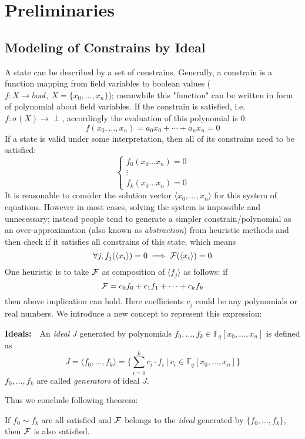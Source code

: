 \section{Preliminaries}
\label{sec:prelim}
\subsection{Modeling of Constrains by Ideal}
A state can be described by a set of constrains. Generally, a constrain is a function mapping 
from field variables to boolean values ($f:X\to bool,\ X=\{x_0,\dots,x_n\}$); meanwhile this "function" can be
written in form of polynomial about field variables. If the constrain is satisfied, i.e. $f:\sigma(X)\to \perp$,
accordingly the evaluation of this polynomial is 0:
$$f(x_0,\dots,x_n) = a_0x_0+\cdots + a_nx_n = 0$$
If a state is valid under some interpretation, then all of its constrains need to be satisfied:
\begin{equation}
\left\{
\begin{array}{ll}
f_0(x_0\dots x_n) = 0\\
\vdots\\
f_k(x_0\dots x_n) = 0
\end{array}\right.
\nonumber
\end{equation}
It is reasonable to consider the solution vector $\langle x_0,\dots,x_n\rangle$ for this system of 
equations. However in most cases, solving the system is impossible and unnecessary; instead people
tend to generate a simpler constrain/polynomial as an over-approximation (also known as \emph{abstraction})
from heuristic methods and then check if it satisfies all constrains of this state, which means
$$\forall j, f_j(\langle x_i\rangle) = 0\implies{\mathcal{F}}(\langle x_i\rangle) = 0  $$
One heuristic is to take ${\mathcal{F}}$ as composition of $\langle f_j\rangle$ as follows: if
$${\mathcal{F}} = c_0f_0+c_1f_1+\cdots+c_kf_k$$
then above implication can hold. Here coefficients $c_j$ could be any polynomials
or real numbers. We introduce a new concept to represent this expression:
\begin{Definition}
{\bf Ideals:}\ \ An \emph{ideal} $J$ generated by polynomials $f_0,\dots,f_k\in \mathbb{F}_q[x_0,\dots,x_n]$
is defined as $$J = \langle f_0,\dots,f_k\rangle = \{\sum_{i=0}^{k}c_i\cdot f_i\ |\ c_i\in\mathbb{F}_q[x_0,
\dots,x_n]\}$$
$f_0,\dots,f_k$ are called \emph{generators} of ideal $J$.
\end{Definition}
Thus we conclude following theorem:
\begin{Theorem}
If $f_0\sim f_k$ are all satisfied and ${\mathcal{F}}$ belongs to the \emph{ideal} generated by $\{f_0,\dots,f_k\}$, then
${\mathcal{F}}$ is also satisfied.
\end{Theorem}

